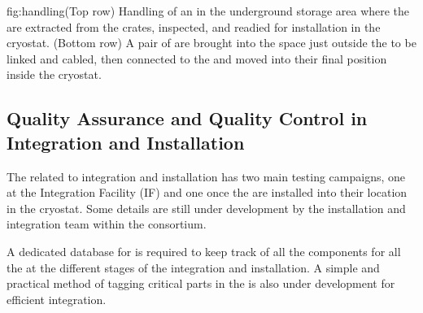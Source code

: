 \begin{dunefigure}{fig:handling}{(Top row) Handling of an  in the underground storage area where the  are extracted from the crates, inspected, and readied for installation in the cryostat. (Bottom row) A pair of  are brought into the space just outside the  to be linked and cabled, then connected to the  and moved into their final position inside the cryostat.}
\setlength{\fboxsep}{0pt}
\setlength{\fboxrule}{0.5pt}
\centering
\hspace*{-.25mm}
\hspace*{1.mm}
\end{dunefigure}


\subsection{Quality Assurance and Quality Control in Integration and Installation}
\label{sec:fdsp-apa-install-calib}

The  related to integration and installation has two main testing campaigns, one at the Integration Facility (IF) and one once the  are installed into their location in the cryostat. Some details are still under development by the installation and integration team within the  consortium. 

A dedicated database for  is required to keep track of all the components for all the  at the different stages of the integration and installation. A simple and practical method of tagging critical parts in the  is also under development for efficient integration.

